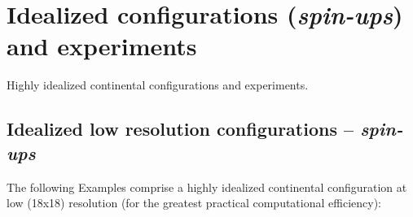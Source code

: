 \documentclass[10pt,twoside]{article}
\begin{document}

\newpage
\section{Idealized configurations (\textit{spin-ups}) and experiments}\label{idealized}


Highly idealized continental configurations and experiments.


\subsection{Idealized low resolution configurations -- \textit{spin-ups}}

The following Examples comprise a highly idealized continental configuration at low (18x18) resolution (for the greatest practical computational efficiency):
\end{document}
